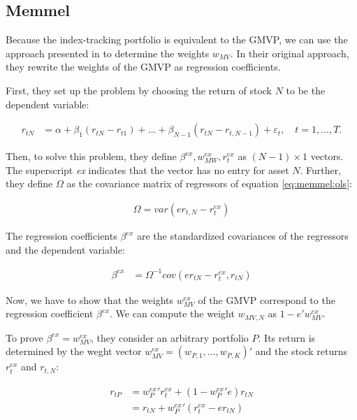 \documentclass[12pt,oneside,a4paper]{memoir}
\begin{document}
\subsection{Memmel}
Because the index-tracking portfolio is equivalent to the GMVP, we can use the approach presented in  to determine the weights $w_{MV}$.
In their original approach, they rewrite the weights of the GMVP as regression coefficients.

First, they set up the problem by choosing the return of stock $N$ to be the dependent variable:

\begin{align}
\label{eq:memmel:ols}
r_{tN} &= \alpha + \beta_{1}(r_{tN}-r_{t1}) + \dots + \beta_{N-1}(r_{tN}-r_{t,N-1})
+ \varepsilon_{t},
\quad
t=1, \dots, T.
\end{align}

\noindent
Then, to solve this problem, they define $\beta^{ex}, w_{MW}^{ex}, r_{t}^{ex}$ as $(N-1) \times 1$ vectors.
The superscript \textit{ex} indicates that the vector has no entry for asset $N$.
Further, they define $\Omega$ as the covariance matrix of regressors of equation \eqref{eq:memmel:ols}:

\begin{align*}
	\Omega = var( e r_{t, N}  - r_{t}^{ex} )
\end{align*}

The regression coefficients $\beta^{ex}$ are the standardized covariances of the regressors and the dependent variable:

\begin{align}
\label{eq:bex}
\beta^{ex} &= \Omega^{-1} cov(e r_{tN} - r_{t}^{ex}, r_{tN})
\end{align}

Now, we have to show that the weights $w_{MV}^{ex}$ of the GMVP correspond to the regression coefficient $\beta^{ex}$.
We can compute the weight $w_{MV, N}$ as $1 - e'w_{MV}^{ex}$.

To prove $\beta^{ex} = w^{ex}_{MV}$, they consider an arbitrary portfolio $P$.
Its return is determined by the weght vector $w^{ex}_{MV}=(w_{P,1}, \dots, w_{P, K})'$ and the stock returns $r^{ex}_{t}$ and $r_{t, N}$:

\begin{align*}
r_{tP} &= w_{P}^{ex}'r_{t}^{ex} + (1- w_{P}^{ex}'e) r_{tN}
\\&=
r_{tN} + w_{P}^{ex}'(r_{t}^{ex} - e r_{tN})
\end{align*}
\end{document}
